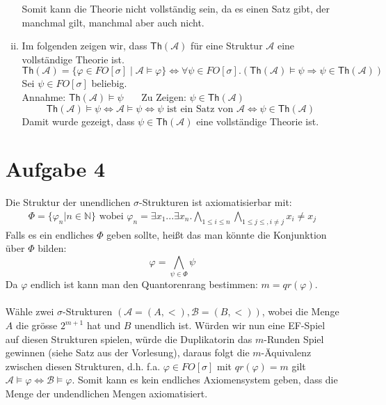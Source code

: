 \documentclass[a4paper,10pt]{article}
\newcommand{\N}{\mathbb{N}}
\begin{document}
\begin{enumerate}[(i)]
\begin{enumerate}[(i)]
Somit kann die Theorie nicht vollständig sein, da es einen Satz gibt, der manchmal gilt, manchmal aber auch nicht. 
\item Im folgenden zeigen wir, dass $\textsf{Th}(\mathcal{A})$ für eine Struktur $\mathcal{A}$ eine vollständige Theorie ist. \\
\[ \textsf{Th}(\mathcal{A}) = \{ \varphi \in FO[\sigma] \mid \mathcal{A} \vDash \varphi\} \Leftrightarrow \forall \psi \in FO[\sigma].(\textsf{Th}(\mathcal{A}) \vDash \psi \Rightarrow \psi \in \textsf{Th}(\mathcal{A}) )\]
Sei $\psi \in FO[\sigma]$ beliebig. \\
Annahme: $\textsf{Th}(\mathcal{A}) \vDash \psi$ \ \ \ Zu Zeigen: $\psi \in \textsf{Th}(\mathcal{A})$
\[ \textsf{Th}(\mathcal{A}) \vDash \psi \Leftrightarrow \mathcal{A} \vDash \psi  \Leftrightarrow \psi \text{ ist ein Satz von } \mathcal{A} \Leftrightarrow \psi \in \textsf{Th}(\mathcal{A})\]
Damit wurde gezeigt, dass $\psi \in \textsf{Th}(\mathcal{A})$ eine vollständige Theorie ist.
\end{enumerate}

\section*{Aufgabe 4}
Die Struktur der unendlichen $\sigma$-Strukturen ist axiomatisierbar mit:
\begin{align*}
	\Phi = \{\varphi_n | n \in \N \} \text{ wobei } \varphi_n = \exists x_1 ... \exists x_n. \bigwedge_{1  \le i \le n} \bigwedge_{1 \le j \le, i \neq j} x_i \neq x_j
\end{align*}
Falls es ein endliches $\Phi$ geben sollte, heißt das man könnte die Konjunktion über $\Phi$ bilden:
\[\varphi = \bigwedge_{\psi \in \Phi} \psi \]
Da $\varphi$ endlich ist kann man den Quantorenrang bestimmen: $m = qr(\varphi)$. \\
\\
Wähle zwei $\sigma$-Strukturen $(\mathcal{A} = (A,<),\mathcal{B} = (B,<))$, wobei die Menge $A$ die grösse $2^{m+1}$ hat und $B$ unendlich ist. Würden wir nun eine EF-Spiel auf diesen Strukturen spielen, würde die Duplikatorin das $m$-Runden Spiel gewinnen (siehe Satz aus der Vorlesung), daraus folgt die $m$-Äquivalenz zwischen diesen Strukturen, d.h. f.a. $\varphi \in FO[\sigma] $ mit $qr(\varphi) = m$ gilt $\mathcal{A} \vDash \varphi \Leftrightarrow \mathcal{B} \vDash \varphi$. Somit kann es kein endliches Axiomensystem geben, dass die Menge der undendlichen Mengen axiomatisiert.

\end{enumerate}
\end{document}
